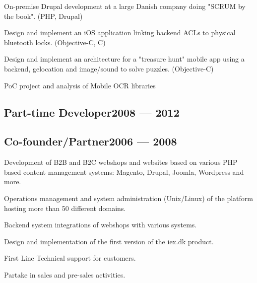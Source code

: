 \begin{zitemize}
	\item On-premise Drupal development at a large Danish company doing "SCRUM by the book". (PHP, Drupal)
	\item Design and implement an iOS application linking backend ACLs to physical bluetooth locks. (Objective-C, C)
	\item Design and implement an architecture for a "treasure hunt" mobile app using a backend, gelocation and image/sound to solve
puzzles. (Objective-C)
	\item PoC project and analysis of Mobile OCR libraries
\end{zitemize}

\subsection{{Part-time Developer\hfill 2008 --- 2012}}
\subsection{{Co-founder/Partner\hfill 2006 --- 2008}}

\begin{zitemize}
	\item Development of B2B and B2C webshops and websites based on various PHP based content management systems: Magento, Drupal, Joomla, Wordpress and more.
	\item Operations management and system administration (Unix/Linux) of the platform hosting more than 50 different domains.
	\item Backend system integrations of webshops with various systems.
	\item Design and implementation of the first version of the iex.dk product.
	\item First Line Technical support for customers.
	\item Partake in sales and pre-sales activities.
\end{zitemize}

